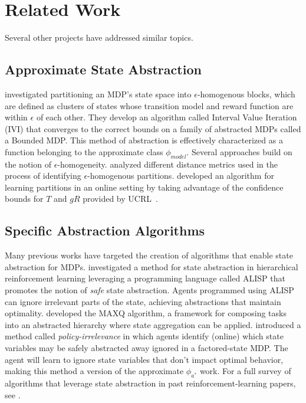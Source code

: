 \section{Related Work}

Several other projects have addressed similar topics.

\subsection{Approximate State Abstraction}
\citeauthor*{dean1997model} investigated partitioning an \ac{MDP}'s state space into $\epsilon$-homogenous blocks, which are defined as clusters of states whose transition model and reward function are within $\epsilon$ of each other. They develop an algorithm called Interval Value Iteration (IVI) that converges to the correct bounds on a family of abstracted MDPs called a Bounded MDP. This method of abstraction is effectively characterized as a function belonging to the approximate class $\phi_{model}$.
Several approaches build on the notion of $\epsilon$-homogeneity. \citeauthor*{even2003approximate} analyzed different distance metrics used in the process of identifying $\epsilon$-homogenous partitions. \citeauthor*{ortner2013adaptive} developed an algorithm for learning partitions in an online setting by taking advantage of the confidence bounds for $T$ and $gR$ provided by UCRL~\cite{auer2009near}.

\subsection{Specific Abstraction Algorithms}
Many previous works have targeted the creation of algorithms that enable state abstraction for MDPs. \citeauthor*{andre2002state} investigated a method for state abstraction in hierarchical reinforcement learning leveraging a programming language called ALISP that promotes the notion of {\it safe} state abstraction. Agents programmed using ALISP can ignore irrelevant parts of the state, achieving abstractions that maintain optimality. \citeauthor{dietterich2000hierarchical} developed the MAXQ algorithm, a framework for composing tasks into an abstracted hierarchy where state aggregation can be applied. \citeauthor*{jong2005state} introduced a method called {\it policy-irrelevance} in which agents identify (online) which state variables may be safely abstracted away ignored in a factored-state \ac{MDP}. The agent will learn to ignore state variables that don't impact optimal behavior, making this method a version of the approximate $\phi_{a^*}$ work. For a full survey of algorithms that leverage state abstraction in past reinforcement-learning papers, see \citeauthor{li2006towards}.

